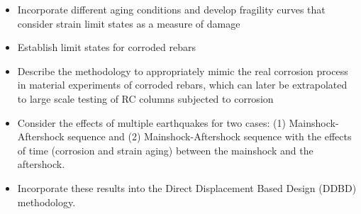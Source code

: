 \begin{itemize}
	\item Incorporate different aging conditions and develop fragility curves that consider strain limit states as a measure of damage
	\item Establish limit states for corroded rebars
	\item Describe the methodology to appropriately mimic the real corrosion process in material experiments of corroded rebars, which can later be extrapolated to large scale testing of RC columns subjected to corrosion
	\item Consider the effects of multiple earthquakes for two cases: (1) Mainshock-Aftershock sequence and (2) Mainshock-Aftershock sequence with the effects of time (corrosion and strain aging) between the mainshock and the aftershock.
	\item Incorporate these results into the Direct Displacement Based Design (DDBD) methodology.
\end{itemize}